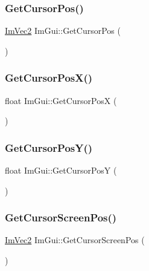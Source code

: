 \mbox{\label{namespace_im_gui_a2fa4eb57e0f73b90e8edcd226a0cc7d5}} 
\subsubsection{\texorpdfstring{Get\+Cursor\+Pos()}{GetCursorPos()}}
{\footnotesize\ttfamily \mbox{\hyperlink{struct_im_vec2}{Im\+Vec2}} Im\+Gui\+::\+Get\+Cursor\+Pos (\begin{DoxyParamCaption}{ }\end{DoxyParamCaption})}

\mbox{\label{namespace_im_gui_a022e32c808ac899e25847f4d65633b77}} 
\subsubsection{\texorpdfstring{Get\+Cursor\+Pos\+X()}{GetCursorPosX()}}
{\footnotesize\ttfamily float Im\+Gui\+::\+Get\+Cursor\+PosX (\begin{DoxyParamCaption}{ }\end{DoxyParamCaption})}

\mbox{\label{namespace_im_gui_a86e409551f256b542166989c558d41c1}} 
\subsubsection{\texorpdfstring{Get\+Cursor\+Pos\+Y()}{GetCursorPosY()}}
{\footnotesize\ttfamily float Im\+Gui\+::\+Get\+Cursor\+PosY (\begin{DoxyParamCaption}{ }\end{DoxyParamCaption})}

\mbox{\label{namespace_im_gui_adb0db3c1ee36f5085f35890a4229ae75}} 
\subsubsection{\texorpdfstring{Get\+Cursor\+Screen\+Pos()}{GetCursorScreenPos()}}
{\footnotesize\ttfamily \mbox{\hyperlink{struct_im_vec2}{Im\+Vec2}} Im\+Gui\+::\+Get\+Cursor\+Screen\+Pos (\begin{DoxyParamCaption}{ }\end{DoxyParamCaption})}

